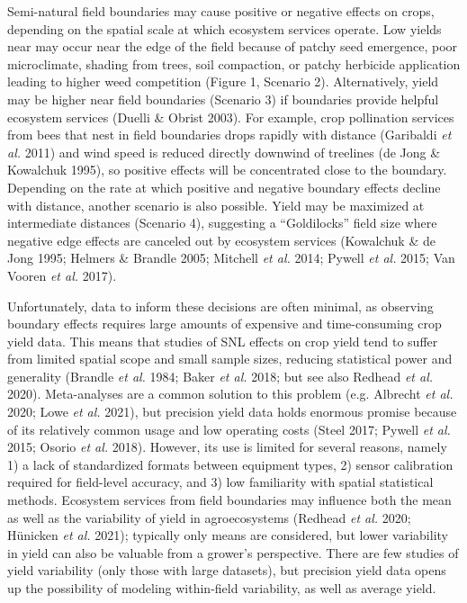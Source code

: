 \documentclass[]{elsarticle} %
\begin{document}
Semi-natural field boundaries may cause positive or negative effects on crops, depending on the spatial scale at which ecosystem services operate.
Low yields near may occur near the edge of the field because of patchy seed emergence, poor microclimate, shading from trees, soil compaction, or patchy herbicide application leading to higher weed competition (Figure 1, Scenario 2).
Alternatively, yield may be higher near field boundaries (Scenario 3) if boundaries provide helpful ecosystem services (Duelli \& Obrist 2003).
For example, crop pollination services from bees that nest in field boundaries drops rapidly with distance (Garibaldi \emph{et al.} 2011) and wind speed is reduced directly downwind of treelines (de Jong \& Kowalchuk 1995), so positive effects will be concentrated close to the boundary.
Depending on the rate at which positive and negative boundary effects decline with distance, another scenario is also possible.
Yield may be maximized at intermediate distances (Scenario 4), suggesting a ``Goldilocks'' field size where negative edge effects are canceled out by ecosystem services (Kowalchuk \& de Jong 1995; Helmers \& Brandle 2005; Mitchell \emph{et al.} 2014; Pywell \emph{et al.} 2015; Van Vooren \emph{et al.} 2017).

Unfortunately, data to inform these decisions are often minimal, as observing boundary effects requires large amounts of expensive and time-consuming crop yield data.
This means that studies of SNL effects on crop yield tend to suffer from limited spatial scope and small sample sizes, reducing statistical power and generality (Brandle \emph{et al.} 1984; Baker \emph{et al.} 2018; but see also Redhead \emph{et al.} 2020).
Meta-analyses are a common solution to this problem (e.g. Albrecht \emph{et al.} 2020; Lowe \emph{et al.} 2021), but precision yield data holds enormous promise because of its relatively common usage and low operating costs (Steel 2017; Pywell \emph{et al.} 2015; Osorio \emph{et al.} 2018).
However, its use is limited for several reasons, namely 1) a lack of standardized formats between equipment types, 2) sensor calibration required for field-level accuracy, and 3) low familiarity with spatial statistical methods.
Ecosystem services from field boundaries may influence both the mean as well as the variability of yield in agroecosystems (Redhead \emph{et al.} 2020; Hünicken \emph{et al.} 2021); typically only means are considered, but lower variability in yield can also be valuable from a grower's perspective.
There are few studies of yield variability (only those with large datasets), but precision yield data opens up the possibility of modeling within-field variability, as well as average yield.
\end{document}
